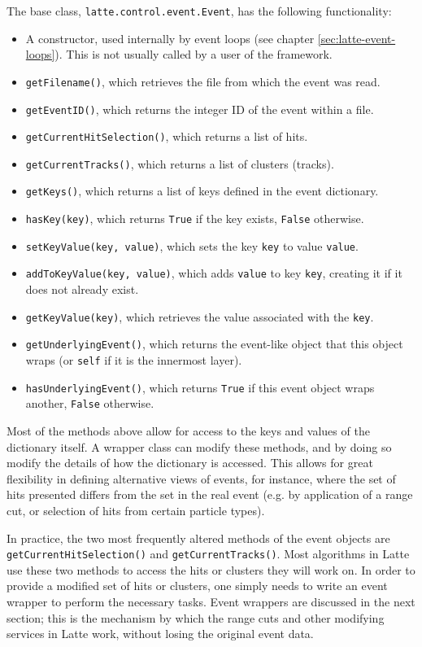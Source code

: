 The base class, \texttt{latte.control.event.Event}, has the following functionality:
\begin{itemize}
\item A constructor, used internally by event loops (see chapter \ref{sec:latte-event-loops}). This is not usually called by a user of the framework.
\item \texttt{getFilename()}, which retrieves the file from which the event was read.
\item \texttt{getEventID()}, which returns the integer ID of the event within a file.
\item \texttt{getCurrentHitSelection()}, which returns a list of hits.
\item \texttt{getCurrentTracks()}, which returns a list of clusters (tracks).
\item \texttt{getKeys()}, which returns a list of keys defined in the event dictionary.
\item \texttt{hasKey(key)}, which returns \texttt{True} if the key exists, \texttt{False} otherwise.
\item \texttt{setKeyValue(key, value)}, which sets the key \texttt{key} to value \texttt{value}.
\item \texttt{addToKeyValue(key, value)}, which adds \texttt{value} to key \texttt{key}, creating it if it does not already exist.
\item \texttt{getKeyValue(key)}, which retrieves the value associated with the \texttt{key}.
\item \texttt{getUnderlyingEvent()}, which returns the event-like object that this object wraps (or \texttt{self} if it is the innermost layer).
\item \texttt{hasUnderlyingEvent()}, which returns \texttt{True} if this event object wraps another, \texttt{False} otherwise.
\end{itemize}

Most of the methods above allow for access to the keys and values of the dictionary itself. A wrapper class can modify these methods, and by doing so modify the details of how the dictionary is accessed. This allows for great flexibility in defining alternative views of events, for instance, where the set of hits presented differs from the set in the real event (e.g. by application of a range cut, or selection of hits from certain particle types).

In practice, the two most frequently altered methods of the event objects are \texttt{getCurrentHitSelection()} and \texttt{getCurrentTracks()}. Most algorithms in Latte use these two methods to access the hits or clusters they will work on. In order to provide a modified set of hits or clusters, one simply needs to write an event wrapper to perform the necessary tasks. Event wrappers are discussed in the next section; this is the mechanism by which the range cuts and other modifying services in Latte work, without losing the original event data.

